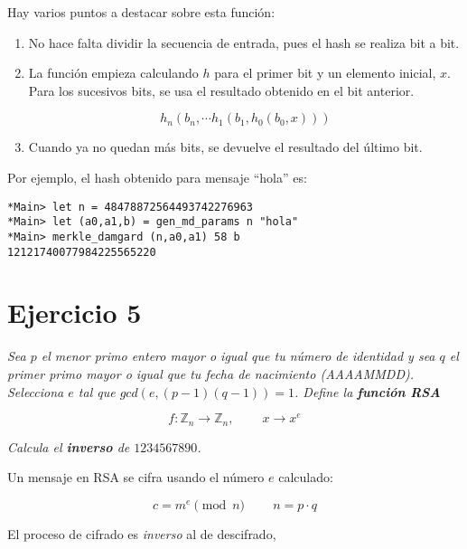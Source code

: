 \documentclass[10pt,spanish]{article}
\begin{document}
Hay varios puntos a destacar sobre esta función:

\begin{enumerate}[\color{azul}{$\longrightarrow$}]
    \item No hace falta dividir la secuencia de entrada, pues el hash se realiza bit a bit.
    \item La función empieza calculando $h$ para el primer bit y un elemento inicial, $x$. Para los sucesivos bits, se usa el resultado obtenido en el bit anterior.

    \begin{displaymath}
        h_n (b_n, \cdots h_1(b_1, h_0(b_0, x)))
    \end{displaymath}

    \item Cuando ya no quedan más bits, se devuelve el resultado del último bit.
\end{enumerate}

Por ejemplo, el hash obtenido para mensaje ``hola'' es:

\begin{verbatim}
*Main> let n = 48478872564493742276963
*Main> let (a0,a1,b) = gen_md_params n "hola"
*Main> merkle_damgard (n,a0,a1) 58 b
12121740077984225565220
\end{verbatim}

\section{\textcolor{azul}Ejercicio 5}
\textit{Sea $p$ el menor primo entero mayor o igual que tu número de identidad y sea $q$ el primer primo mayor o igual que tu fecha de nacimiento (AAAAMMDD). Selecciona $e$ tal que $gcd(e, (p-1)(q-1)) = 1$. Define la \textcolor{azul}{\textbf{función RSA}}}

\begin{displaymath}
    f: \mathbb{Z}_n \rightarrow \mathbb{Z}_n, \qquad\ x \rightarrow x^e
\end{displaymath}

\textit{Calcula el \textbf{\textcolor{azul}{inverso}} de $1234567890$.
}

Un mensaje en RSA se cifra usando el número $e$ calculado:

\begin{displaymath}
    c = m^e \pmod n \qquad\ n = p\cdot q
\end{displaymath}

El proceso de cifrado es \textit{\textcolor{azul}{inverso}} al de descifrado,
\end{document}
